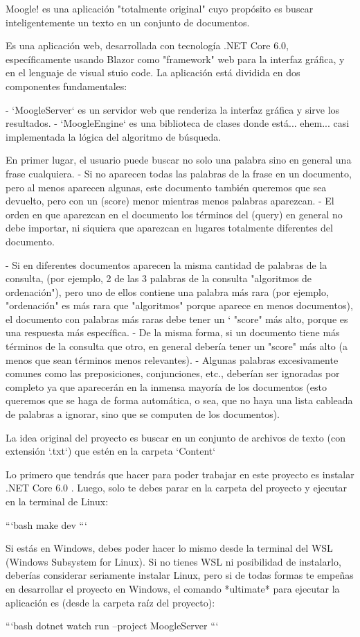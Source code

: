 \documentclass{beamer}
\begin{document}
\begin{frame}
Moogle! es una aplicación "totalmente original" cuyo propósito es buscar inteligentemente un texto en un conjunto de documentos.

Es una aplicación web, desarrollada con tecnología .NET Core 6.0, específicamente usando Blazor como "framework" web para la interfaz gráfica, y en el lenguaje de visual stuio code.
La aplicación está dividida en dos componentes fundamentales:

- `MoogleServer` es un servidor web que renderiza la interfaz gráfica y sirve los resultados.
- `MoogleEngine` es una biblioteca de clases donde está... ehem... casi implementada la lógica del algoritmo de búsqueda.

 En primer lugar, el usuario puede buscar no solo una palabra sino en general una frase cualquiera.
- Si no aparecen todas las palabras de la frase en un documento, pero al menos aparecen algunas, este documento también queremos que sea devuelto, pero con un (score) menor mientras menos palabras aparezcan.
- El orden en que aparezcan en el documento los términos del (query) en general no debe importar, ni siquiera que aparezcan en lugares totalmente diferentes del documento.
\end{frame}
\begin{frame}

- Si en diferentes documentos aparecen la misma cantidad de palabras de la consulta, (por ejemplo, 2 de las 3 palabras de la consulta "algoritmos de ordenación"), pero uno de ellos contiene una palabra más rara (por ejemplo, "ordenación" es más rara que "algoritmos" porque aparece en menos documentos), el documento con palabras más raras debe tener un `
"score" más alto, porque es una respuesta más específica.
- De la misma forma, si un documento tiene más términos de la consulta que otro, en general debería tener un "score" más alto (a menos que sean términos menos relevantes).
- Algunas palabras excesivamente comunes como las preposiciones, conjunciones, etc., deberían ser ignoradas por completo ya que aparecerán en la inmensa mayoría de los documentos (esto queremos que se haga de forma automática, o sea, que no haya una lista cableada de palabras a ignorar, sino que se computen de los documentos).

La idea original del proyecto es buscar en un conjunto de archivos de texto (con extensión `.txt`) que estén en la carpeta `Content`


Lo primero que tendrás que hacer para poder trabajar en este proyecto es instalar .NET Core 6.0 . Luego, solo te debes parar en la carpeta del proyecto y ejecutar en la terminal de Linux:

```bash
make dev
```

Si estás en Windows, debes poder hacer lo mismo desde la terminal del WSL (Windows Subsystem for Linux). Si no tienes WSL ni posibilidad de instalarlo, deberías considerar seriamente instalar Linux, pero si de todas formas te empeñas en desarrollar el proyecto en Windows, el comando *ultimate* para ejecutar la aplicación es (desde la carpeta raíz del proyecto):

```bash
dotnet watch run --project MoogleServer
```
\end{frame}
\end{document}
